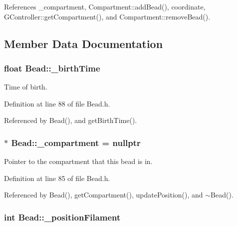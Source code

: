 References \+\_\+compartment, Compartment\+::add\+Bead(), coordinate, G\+Controller\+::get\+Compartment(), and Compartment\+::remove\+Bead().



\subsection{Member Data Documentation}
\hypertarget{classBead_a356c8525fcf176bca4cd539f735c1de6}{
\subsubsection[{\+\_\+birth\+Time}]{\setlength{\rightskip}{0pt plus 5cm}float Bead\+::\+\_\+birth\+Time\hspace{0.3cm}{\ttfamily [private]}}}\label{classBead_a356c8525fcf176bca4cd539f735c1de6}


Time of birth. 



Definition at line 88 of file Bead.\+h.



Referenced by Bead(), and get\+Birth\+Time().

\hypertarget{classBead_ac9d2080d5d8f80f60535dfeea9cd38e9}{
\subsubsection[{\+\_\+compartment}]{$\ast$ Bead\+::\+\_\+compartment = nullptr\hspace{0.3cm}{\ttfamily [private]}}}\label{classBead_ac9d2080d5d8f80f60535dfeea9cd38e9}


Pointer to the compartment that this bead is in. 



Definition at line 85 of file Bead.\+h.



Referenced by Bead(), get\+Compartment(), update\+Position(), and $\sim$\+Bead().

\hypertarget{classBead_a0eafb8f259549846d4714e6120cbc87c}{
\subsubsection[{\+\_\+position\+Filament}]{\setlength{\rightskip}{0pt plus 5cm}int Bead\+::\+\_\+position\+Filament\hspace{0.3cm}{\ttfamily [private]}}}\label{classBead_a0eafb8f259549846d4714e6120cbc87c}


